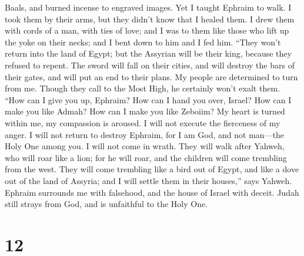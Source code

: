Baals, and burned incense to engraved images.  Yet I
taught Ephraim to walk. I took them by their arms, but they didn't know
that I healed them.  I drew them with cords of a man, with
ties of love; and I was to them like those who lift up the yoke on their
necks; and I bent down to him and I fed him.  ``They won't
return into the land of Egypt; but the Assyrian will be their king,
because they refused to repent.  The sword will fall on
their cities, and will destroy the bars of their gates, and will put an
end to their plans.  My people are determined to turn from
me. Though they call to the Most High, he certainly won't exalt them.
 ``How can I give you up, Ephraim? How can I hand you
over, Israel? How can I make you like Admah? How can I make you like
Zeboiim? My heart is turned within me, my compassion is aroused.
 I will not execute the fierceness of my anger. I will not
return to destroy Ephraim, for I am God, and not man---the Holy One
among you. I will not come in wrath.  They will walk
after Yahweh, who will roar like a lion; for he will roar, and the
children will come trembling from the west.  They will
come trembling like a bird out of Egypt, and like a dove out of the land
of Assyria; and I will settle them in their houses,'' says Yahweh.
 Ephraim surrounds me with falsehood, and the house of
Israel with deceit. Judah still strays from God, and is unfaithful to
the Holy One.

\hypertarget{section-6}{%
\section{12}\label{section-6}}

